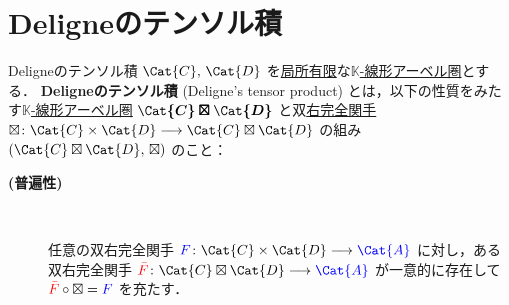 \documentclass[TQFT_main]{subfiles}
\begin{document}
\section{Deligneのテンソル積}

\begin{mydef}[label=def:DeligneProduct]{Deligneのテンソル積}
    $\Cat{C},\, \Cat{D}$ を\hyperref[def:finite-abcat]{局所有限}な\hyperref[def:additive-cat]{$\mathbb{K}$-線形アーベル圏}とする．
    \textbf{Deligneのテンソル積} (Deligne's tensor product) とは，以下の性質をみたす\hyperref[def:additive-cat]{$\mathbb{K}$-線形アーベル圏} $\bm{\Cat{C} \boxtimes \Cat{D}}$ と双\hyperref[def:additive-exact]{右完全関手} $\boxtimes \colon \Cat{C} \times \Cat{D} \lto \Cat{C} \boxtimes \Cat{D}$ の組み $(\Cat{C} \boxtimes \Cat{D},\, \boxtimes)$ のこと：
    \begin{description}
        \item[\textbf{(普遍性)}]　
        
        任意の双右完全関手 $\textcolor{blue}{F} \colon \Cat{C} \times \Cat{D} \lto \textcolor{blue}{\Cat{A}}$ に対し，ある双右完全関手 $\textcolor{red}{\bar{F}} \colon \Cat{C} \boxtimes \Cat{D} \lto \textcolor{blue}{\Cat{A}}$ が一意的に存在して $\textcolor{red}{\bar{F}} \circ \boxtimes = \textcolor{blue}{F}$ を充たす．
        \begin{center}
        \end{center}
    \end{description}
\end{mydef}
\end{document}

